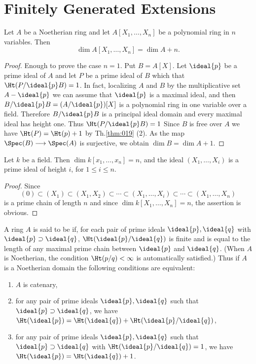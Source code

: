 \documentclass[../main]{subfiles}
\begin{document}
\section{Finitely Generated Extensions}\label{sec:14}

\begin{partheorem}\label{thm:022}
Let $A$ be a Noetherian ring and let $A[X_1, \ldots, X_n]$ be a polynomial ring in $n$ variables. Then \[\dim A[X_1, \ldots, X_n]=\dim A+n.\]
\end{partheorem}

\begin{proof}
Enough to prove the case $n=1$. Put $B=A[X]$. Let $\ideal{p}$ be a prime ideal of $A$ and let $P$ be a prime ideal of $B$ which that $\Ht(P /\ideal{p}B)=1$. In fact, localizing $A$ and $B$ by the multiplicative set $A-\ideal{p}$ we can assume that $\ideal{p}$ is a maximal ideal, and then $B / \ideal{p} B=(A / \ideal{p})[X]$ is a polynomial ring in one variable over a field. Therefore $B / \ideal{p} B$ is a principal ideal domain and every maximal ideal has height one. Thus $\Ht(P / \ideal{p} B)=1$ Since $B$ is free over $A$ we have $\Ht(P)=\Ht(p)+1$ by Th.\ref{thm:019} (2). As the map $\Spec(B) \longrightarrow \Spec(A)$ is surjective, we obtain $\dim B=\dim A+1$.
\end{proof}

\begin{corollary}\label{cor:14.01}
Let $k$ be a field. Then $\dim k[x_1, \ldots, x_n]=n$, and the ideal $(X_1, \ldots, X_i)$ is a prime ideal of height $i$, for $1 \leqslant i \leqslant n$.
\end{corollary}

\begin{proof}
Since \[(0) \subset (X_1) \subset(X_1, X_2) \subset \cdots \subset(X_1, \ldots, X_i) \subset \cdots \subset(X_1, \ldots, X_n)\] is a prime chain of length $n$ and since $\dim k[X_1, \ldots, X_n]=n$, the assertion is obvious.
\end{proof}

\newparagraph
A ring $A$ is said to be  if, for each pair of prime ideals $\ideal{p}, \ideal{q}$ with $\ideal{p} \supset \ideal{q}$, $\Ht(\ideal{p} / \ideal{q})$ is finite and is equal to the length of any maximal prime chain between $\ideal{p}$ and $\ideal{q}$. (When $A$ is Noetherian, the condition $\Ht(p / q)<\infty$ is automatically satisfied.) Thus if $A$ is a Noetherian domain the following conditions are equivalent:

\begin{enumerate}[label=(\arabic*)]
    \item $A$ is catenary,
    \item for any pair of prime ideals $\ideal{p}, \ideal{q}$ such that $\ideal{p} \supset \ideal{q}$, we have\newline $\Ht(\ideal{p})=\Ht(\ideal{q})+\Ht(\ideal{p}/\ideal{q})$,
    \item for any pair of prime ideals $\ideal{p}, \ideal{q}$ such that $\ideal{p} \supset \ideal{q}$ with $\Ht(\ideal{p} / \ideal{q})=1$, we have $\Ht(\ideal{p})=\Ht(\ideal{q})+1$.
\end{enumerate}
\end{document}
